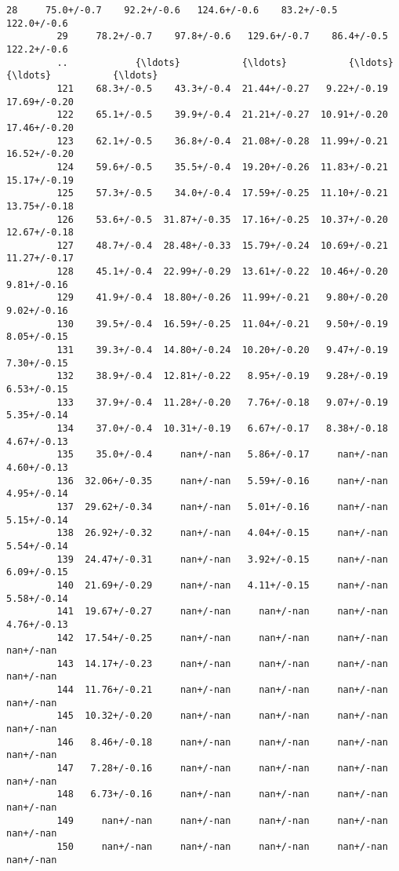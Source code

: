 \documentclass[11pt]{article}
\begin{document}
\begin{Verbatim}[commandchars=\\\{\}]
         28     75.0+/-0.7    92.2+/-0.6   124.6+/-0.6    83.2+/-0.5   122.0+/-0.6   
         29     78.2+/-0.7    97.8+/-0.6   129.6+/-0.7    86.4+/-0.5   122.2+/-0.6   
         ..            {\ldots}           {\ldots}           {\ldots}           {\ldots}           {\ldots}   
         121    68.3+/-0.5    43.3+/-0.4  21.44+/-0.27   9.22+/-0.19  17.69+/-0.20   
         122    65.1+/-0.5    39.9+/-0.4  21.21+/-0.27  10.91+/-0.20  17.46+/-0.20   
         123    62.1+/-0.5    36.8+/-0.4  21.08+/-0.28  11.99+/-0.21  16.52+/-0.20   
         124    59.6+/-0.5    35.5+/-0.4  19.20+/-0.26  11.83+/-0.21  15.17+/-0.19   
         125    57.3+/-0.5    34.0+/-0.4  17.59+/-0.25  11.10+/-0.21  13.75+/-0.18   
         126    53.6+/-0.5  31.87+/-0.35  17.16+/-0.25  10.37+/-0.20  12.67+/-0.18   
         127    48.7+/-0.4  28.48+/-0.33  15.79+/-0.24  10.69+/-0.21  11.27+/-0.17   
         128    45.1+/-0.4  22.99+/-0.29  13.61+/-0.22  10.46+/-0.20   9.81+/-0.16   
         129    41.9+/-0.4  18.80+/-0.26  11.99+/-0.21   9.80+/-0.20   9.02+/-0.16   
         130    39.5+/-0.4  16.59+/-0.25  11.04+/-0.21   9.50+/-0.19   8.05+/-0.15   
         131    39.3+/-0.4  14.80+/-0.24  10.20+/-0.20   9.47+/-0.19   7.30+/-0.15   
         132    38.9+/-0.4  12.81+/-0.22   8.95+/-0.19   9.28+/-0.19   6.53+/-0.15   
         133    37.9+/-0.4  11.28+/-0.20   7.76+/-0.18   9.07+/-0.19   5.35+/-0.14   
         134    37.0+/-0.4  10.31+/-0.19   6.67+/-0.17   8.38+/-0.18   4.67+/-0.13   
         135    35.0+/-0.4     nan+/-nan   5.86+/-0.17     nan+/-nan   4.60+/-0.13   
         136  32.06+/-0.35     nan+/-nan   5.59+/-0.16     nan+/-nan   4.95+/-0.14   
         137  29.62+/-0.34     nan+/-nan   5.01+/-0.16     nan+/-nan   5.15+/-0.14   
         138  26.92+/-0.32     nan+/-nan   4.04+/-0.15     nan+/-nan   5.54+/-0.14   
         139  24.47+/-0.31     nan+/-nan   3.92+/-0.15     nan+/-nan   6.09+/-0.15   
         140  21.69+/-0.29     nan+/-nan   4.11+/-0.15     nan+/-nan   5.58+/-0.14   
         141  19.67+/-0.27     nan+/-nan     nan+/-nan     nan+/-nan   4.76+/-0.13   
         142  17.54+/-0.25     nan+/-nan     nan+/-nan     nan+/-nan     nan+/-nan   
         143  14.17+/-0.23     nan+/-nan     nan+/-nan     nan+/-nan     nan+/-nan   
         144  11.76+/-0.21     nan+/-nan     nan+/-nan     nan+/-nan     nan+/-nan   
         145  10.32+/-0.20     nan+/-nan     nan+/-nan     nan+/-nan     nan+/-nan   
         146   8.46+/-0.18     nan+/-nan     nan+/-nan     nan+/-nan     nan+/-nan   
         147   7.28+/-0.16     nan+/-nan     nan+/-nan     nan+/-nan     nan+/-nan   
         148   6.73+/-0.16     nan+/-nan     nan+/-nan     nan+/-nan     nan+/-nan   
         149     nan+/-nan     nan+/-nan     nan+/-nan     nan+/-nan     nan+/-nan   
         150     nan+/-nan     nan+/-nan     nan+/-nan     nan+/-nan     nan+/-nan   
         

\end{Verbatim}
\end{document}
